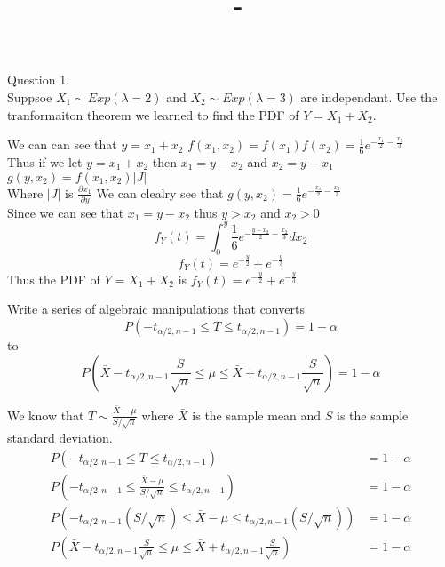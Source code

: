\documentclass[answers,12pt,addpoints]{exam}
\author{\name}
\title{\course \ - \assignment}
\begin{document}
\maketitle


\newpage
\begin{questions}
    \question Question 1.\\
    Suppsoe $X_1 \sim Exp(\lambda = 2)$ and $X_2 \sim Exp(\lambda = 3)$ are independant. Use the tranformaiton theorem we learned to find the PDF of $Y = X_1 + X_2$.
    \begin{solution}
        We can can see that $y = x_1 +x_2$
        $f(x_1,x_2) = f(x_1)f(x_2) = \frac{1}{6}e^{-\frac{x_1}{2} - \frac{x_2}{3}}$\\
        Thus if we let $y = x_1 + x_2$ then $x_1 = y - x_2$ and $x_2 = y - x_1$\\
        $g(y, x_2) = f(x_1 ,x_2) |J|$\\
        Where $|J|$ is $\frac{\partial x_1}{\partial y}$ 
        We can clealry see that $g(y, x_2) = \frac{1}{6}e^{-\frac{x_1}{2} - \frac{x_2}{3}}$\\
        Since we can see that $x_1 = y - x_2$ thus $y > x_2$ and $x_2 > 0$\\
        $$f_Y(t) = \int_0^y \frac{1}{6}e^{-\frac{y-x_2}{2} - \frac{x_2}{3}}dx_2$$
        $$f_Y(t) = e^{-\frac{y}{2}} + e^{-\frac{y}{3}}$$
        Thus the PDF of $Y = X_1 + X_2$ is $f_Y(t) = e^{-\frac{y}{2}} + e^{-\frac{y}{3}}$
    \end{solution}

    \question Write a series of algebraic manipulations that converts
    $$ P(-t_{\alpha/2, n-1} \leq T \leq t_{\alpha/2, n-1}) = 1 - \alpha $$
    to 
    $$ P(\bar{X} - t_{\alpha/2, n-1} \frac{S}{\sqrt{n}} \leq \mu \leq \bar{X} + t_{\alpha/2, n-1} \frac{S}{\sqrt{n}}) = 1 - \alpha $$
    \begin{solution}
        We know that $T \sim \frac{\bar{X} - \mu }{S / \sqrt{n}}$ where $\bar{X}$ is the sample mean and $S$ is the sample standard deviation.\\
        \begin{align*}
            P(-t_{\alpha/2, n-1} \leq T \leq t_{\alpha/2, n-1}) &= 1 - \alpha\\
            P(-t_{\alpha/2, n-1} \leq \frac{\bar{X} - \mu}{S / \sqrt{n}} \leq t_{\alpha/2, n-1}) &= 1 - \alpha\\
            P(-t_{\alpha/2, n-1} (S / \sqrt{n}) \leq \bar{X} - \mu \leq t_{\alpha/2, n-1} (S / \sqrt{n})) &= 1 - \alpha\\
            P(\bar{X} - t_{\alpha/2, n-1} \frac{S}{\sqrt{n}} \leq \mu \leq \bar{X} + t_{\alpha/2, n-1} \frac{S}{\sqrt{n}}) &= 1 - \alpha
        \end{align*}
        

\end{solution}
\end{questions}
\end{document}
